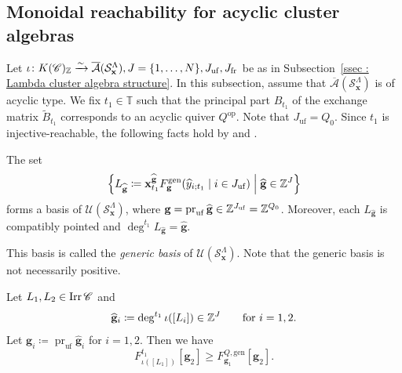 \subsection{Monoidal reachability for acyclic cluster algebras}
\label{ssec : monoidal reachability for acyclic cluster algebras}

Let
$\iota \colon K(\mathscr{C})_{\mathbb{Z}}
\xrightarrow{\sim}
\overline{\mathcal{A}}(\mathcal{S}_{\mathbf{x}}^{\Lambda}),J = 
\{1, \ldots, N\},J_{\mathrm{uf}},J_{\mathrm{fr}}$
be as in Subsection~\ref{ssec : Lambda cluster algebra structure}.
In this subsection, assume that
$\overline{\mathcal{A}}(\mathcal{S}_{\mathbf{x}}^{\Lambda})$
is of acyclic type.
We fix $t_1 \in \mathbb{T}$ such that the principal part $B_{t_1}$
of the exchange matrix $\widetilde{B}_{t_1}$ corresponds to
an acyclic quiver $Q^{\mathrm{op}}$.
Note that $J_{\mathrm{uf}} = Q_0$.
Since $t_1$ is injective-reachable, the following facts hold by
\cite[Theorem 1.3]{Plam13} and
\cite[Theorem 5.2.2]{Qin24}.

\begin{Lem}
\label{Lem : generic basis and compatible pointedness}
The set
\[
\left\{
L_{\widehat{\mathbf{g}}}
\coloneq \mathbf{x}_{t_1}^{\widehat{\mathbf{g}}}
F^{\mathrm{gen}}_{\mathbf{g}}
(\widehat{y}_{i;t_1} \mid i \in J_{\mathrm{uf}})
\;\middle|\; \widehat{\mathbf{g}} \in \mathbb{Z}^J
\right\}
\]
forms a basis of $\mathcal{U}(\mathcal{S}_{\mathbf{x}}^{\Lambda})$,
where $\mathbf{g} = \operatorname{pr}_{\mathrm{uf}}
\widehat{\mathbf{g}} \in \mathbb{Z}^{J_{\mathrm{uf}}} = \mathbb{Z}^{Q_0}$.
Moreover, each $L_{\widehat{\mathbf{g}}}$ is compatibly pointed and
$\deg^{t_1}L_{\widehat{\mathbf{g}}} = \widehat{\mathbf{g}}$.
\end{Lem}

This basis is called the \emph{generic basis} of
$\mathcal{U}(\mathcal{S}_{\mathbf{x}}^{\Lambda})$.
Note that the generic basis is not necessarily positive.

\begin{Prop}
\label{Prop : tropical F dominates generic tropical F}
Let $L_1, L_2 \in \mathop{\mathrm{Irr}}\nolimits\mathscr{C}$ and
\[
\widehat{\mathbf{g}}_i
\coloneq \deg^{t_1}\iota([L_i]) \in \mathbb{Z}^J
\qquad\text{for }i = 1, 2.
\]
Let $\mathbf{g}_i
\coloneq \operatorname{pr}_{\mathrm{uf}}\widehat{\mathbf{g}}_i$
for $i = 1, 2$.
Then we have
\[
F^{t_1}_{\iota([L_1])}[\mathbf{g}_2]
\geq F^{Q,\mathrm{gen}}_{\mathbf{g}_1}[\mathbf{g}_2].
\]
\end{Prop}

